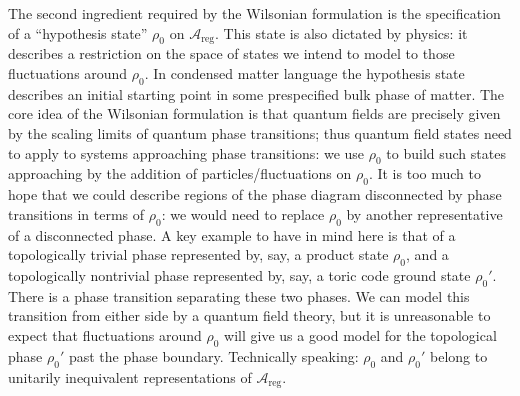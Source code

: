 \documentclass[11pt]{amsart}
\theoremstyle{plain}%
\theoremstyle{definition}
\theoremstyle{remark}
\begin{document}
The second ingredient required by the Wilsonian formulation is the specification of a ``hypothesis state'' 
$\rho_0$ on $\mathcal{A}_{\text{reg}}$. This state is also dictated by physics: it describes a restriction on the space of states we intend to model to those fluctuations around $\rho_0$. In condensed matter language the hypothesis state describes an initial starting point in some prespecified bulk phase of matter. The core idea of the Wilsonian formulation is that quantum fields are precisely given by the scaling limits of quantum phase transitions; thus quantum field states need to apply to systems approaching phase transitions: we use $\rho_0$ to build such states approaching by the addition of particles/fluctuations on $\rho_0$. It is too much to hope that we could describe regions of the phase diagram disconnected by phase transitions in terms of $\rho_0$: we would need to replace $\rho_0$ by another representative of a disconnected phase. A key example to have in mind here is that of a topologically trivial phase represented by, say, a product state $\rho_0$, and a topologically nontrivial phase represented by, say, a toric code \cite{kitaev_fault-tolerant_2003} ground state $\rho_0'$. There is a phase transition separating these two phases. We can model this transition from either side by a quantum field theory, but it is unreasonable to expect that fluctuations around $\rho_0$ will give us a good model for the topological phase $\rho_0'$ past the phase boundary. Technically speaking: $\rho_0$ and $\rho_0'$ belong to unitarily inequivalent representations of $\mathcal{A}_{\text{reg}}$. 
\end{document}
